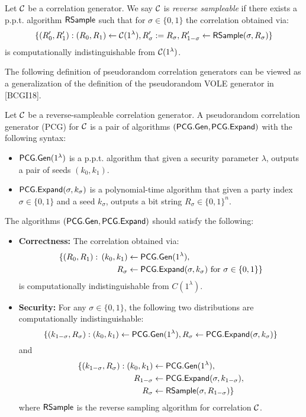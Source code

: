 \begin{definition}\label{def:reverse-sampleable_correlation_generator)}
    Let $\mathcal{C}$ be a correlation generator. We say $\mathcal{C}$ is \emph{reverse sampleable} if there exists a p.p.t. algorithm $\sf RSample$ such that for $\sigma \in \{0, 1\}$ the correlation obtained via: \[
    \{(R'_0, R'_1) :(R_0, R_1)\gets \mathcal{C}(1^\lambda), R'_\sigma := R_\sigma, R'_{1-\sigma}\gets {\sf RSample}(\sigma, R_\sigma)\}
    \]
    is computationally indistinguishable from $\mathcal{C}(1^\lambda)$.
\end{definition}
 The following definition of pseudorandom correlation generators can be viewed as a generalization of the definition of the pseudorandom VOLE generator in [BCGI18]. 
 \begin{definition}
     Let $\mathcal{C}$ be a reverse-sampleable correlation generator. A pseudorandom correlation generator (PCG) for $\mathcal{C}$ is a pair of algorithms $({\sf PCG}.{\sf Gen}, $\linebreak${\sf PCG}.{\sf Expand})$ with the following syntax: 
     \begin{itemize}
         \item ${\sf PCG}.{\sf Gen}(1^\lambda)$ is a p.p.t. algorithm that given a security parameter $\lambda$, outputs a pair of seeds $(k_0,k_1)$.
         \item ${\sf PCG}.{\sf Expand}(\sigma, k_\sigma)$ is a polynomial-time algorithm that given a party index $\sigma\in\{0,1\}$ and a seed $k_\sigma$, outputs a bit string $R_\sigma\in\{0,1\}^n$.
     \end{itemize} 
     The algorithms $({\sf PCG}.{\sf Gen}, {\sf PCG}.{\sf Expand})$ should satisfy the following:
     \begin{itemize}
         \item \textbf{Correctness: }The correlation obtained via: \[
         \begin{split}
             \{(R_0, R_1):\,(k_0, k_1) &\gets {\sf PCG}.{\sf Gen}(1^\lambda), \\R_\sigma&\gets {\sf PCG}.{\sf Expand}(\sigma, k_\sigma) \text{ for } \sigma\in\{0,1\}\}
         \end{split}\] is computationally indistinguishable from $C(1^\lambda)$.
         \item \textbf{Security: }For any $\sigma\in\{0,1\}$, the following two distributions are computationally indistinguishable:
         \[\{(k_{1-\sigma}, R_\sigma): (k_0, k_1) \gets {\sf PCG}.{\sf Gen}(1^\lambda),R_\sigma\gets {\sf PCG}.{\sf Expand}(\sigma, k_\sigma)\}\]
         and
         \[
         \begin{split}
            \{(k_{1-\sigma}, R_\sigma): (k_0, k_1)&\gets {\sf PCG}.{\sf Gen}(1^\lambda),\\R_{1-\sigma}&\gets {\sf PCG}.{\sf Expand}(\sigma, k_{1-\sigma}),\\R_\sigma&\gets{\sf RSample}(\sigma, R_{1-\sigma})\}
         \end{split}
         \]
         where $\sf RSample$ is the reverse sampling algorithm for correlation $\mathcal{C}$.
     \end{itemize}
 \end{definition} 
